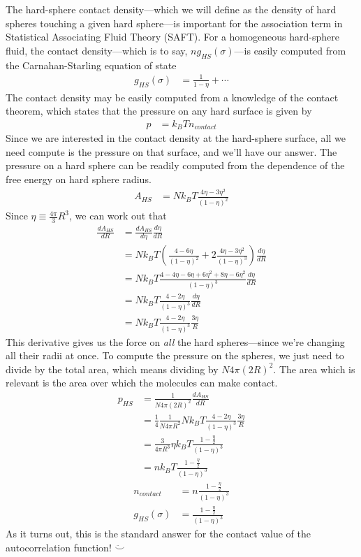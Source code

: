 \documentclass[letterpaper,twocolumn,amsmath,amssymb,prb]{revtex4-1}
\begin{document}
The hard-sphere contact density---which we will define as the density
of hard spheres touching a given hard sphere---is important for the
association term in Statistical Associating Fluid Theory (SAFT).  For
a homogeneous hard-sphere fluid, the contact density---which is to
say, $n g_{HS}(\sigma)$---is easily computed from the
Carnahan-Starling equation of state
\begin{align}
  g_{HS}(\sigma) &= \frac{1}{1-\eta} + \cdots
\end{align}
The contact density may be easily computed from a knowledge of the
contact theorem, which states that the pressure on any hard surface is
given by
\begin{align}
  p &= k_BT n_\textit{contact}
\end{align}
Since we are interested in the contact density at the hard-sphere
surface, all we need compute is the pressure on that surface, and
we'll have our answer.  The pressure on a hard sphere can be readily
computed from the dependence of the free energy on hard sphere
radius.
\begin{align}
  A_{HS} &= Nk_BT \frac{4\eta - 3\eta^2}{(1-\eta)^2}
\end{align}
Since $\eta \equiv \frac{4\pi}{3} R^3$, we can work out that
\begin{align}
  \frac{dA_{HS}}{dR} &= \frac{dA_{HS}}{d\eta} \frac{d\eta}{dR} \\
  &= Nk_BT \left( \frac{4 - 6\eta}{(1-\eta)^2} + 2 \frac{4\eta - 3\eta^2}{(1-\eta)^3} \right) \frac{d\eta}{dR}
  \\
  &= Nk_BT \frac{4 - 4\eta - 6\eta + 6\eta^2 + 8\eta - 6\eta^2}{(1-\eta)^3} \frac{d\eta}{dR}
  \\
  &= Nk_BT \frac{4 - 2\eta}{(1-\eta)^3} \frac{d\eta}{dR}
  \\
  &= Nk_BT \frac{4 - 2\eta}{(1-\eta)^3} \frac{3 \eta}{R}
\end{align}
This derivative gives us the force on \emph{all} the hard
spheres---since we're changing all their radii at once.  To compute
the pressure on the spheres, we just need to divide by the total area,
which means dividing by $N 4\pi (2R)^2$.  The area which is relevant
is the area over which the molecules can make contact.
\begin{align}
  p_{HS} &= \frac{1}{N 4\pi (2R)^2} \frac{dA_{HS}}{dR} \\
  &= \frac14 \frac{1}{N 4\pi R^2} Nk_BT \frac{4 - 2\eta}{(1-\eta)^3} \frac{3 \eta}{R} \\
  &= \frac{3}{4\pi R^3} \eta k_BT \frac{1 - \frac{\eta}2}{(1-\eta)^3} \\
  &= n k_BT \frac{1 - \frac{\eta}2}{(1-\eta)^3}
\end{align}
\begin{align}
  n_\textit{contact} &= n \frac{1 - \frac{\eta}2}{(1-\eta)^3} \\
  g_{HS}(\sigma) &= \frac{1 - \frac{\eta}2}{(1-\eta)^3}
\end{align}
As it turns out, this is the standard answer for the contact value of
the autocorrelation function! $\ddot\smile$
\end{document}
